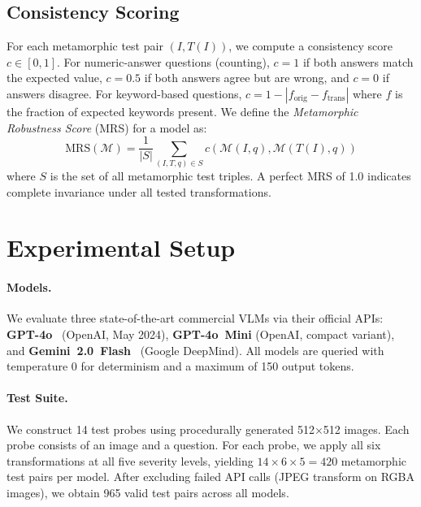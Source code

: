 \documentclass[10pt,twocolumn,letterpaper]{article}
\begin{document}
\subsection{Consistency Scoring}

For each metamorphic test pair $(I, T(I))$, we compute a consistency score $c \in [0, 1]$. For numeric-answer questions (counting), $c = 1$ if both answers match the expected value, $c = 0.5$ if both answers agree but are wrong, and $c = 0$ if answers disagree. For keyword-based questions, $c = 1 - |f_\text{orig} - f_\text{trans}|$ where $f$ is the fraction of expected keywords present. We define the \emph{Metamorphic Robustness Score} (MRS) for a model as:
\begin{equation}
    \text{MRS}(\mathcal{M}) = \frac{1}{|S|} \sum_{(I, T, q) \in S} c(\mathcal{M}(I, q), \mathcal{M}(T(I), q))
\end{equation}
where $S$ is the set of all metamorphic test triples. A perfect MRS of 1.0 indicates complete invariance under all tested transformations.

\section{Experimental Setup}
\label{sec:setup}

\paragraph{Models.} We evaluate three state-of-the-art commercial VLMs via their official APIs: \textbf{GPT-4o}~\cite{openai2024gpt4o} (OpenAI, May 2024), \textbf{GPT-4o~Mini} (OpenAI, compact variant), and \textbf{Gemini~2.0~Flash}~\cite{team2024gemini} (Google DeepMind). All models are queried with temperature 0 for determinism and a maximum of 150 output tokens.

\paragraph{Test Suite.} We construct 14 test probes using procedurally generated 512$\times$512 images. Each probe consists of an image and a question. For each probe, we apply all six transformations at all five severity levels, yielding $14 \times 6 \times 5 = 420$ metamorphic test pairs per model. After excluding failed API calls (JPEG transform on RGBA images), we obtain 965 valid test pairs across all models.
\end{document}
